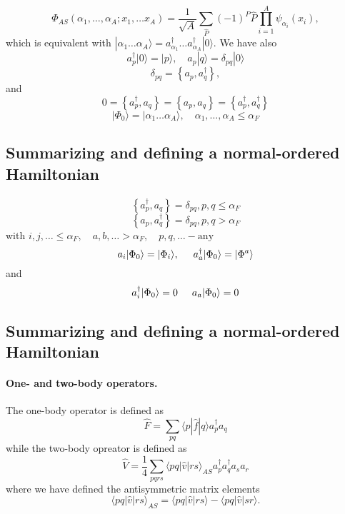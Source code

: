 \documentclass[%
twoside,                 %
final,                   %
10pt]{article}
\begin{document}
\paragraph{}
\[
  \Phi_{AS}(\alpha_1, \dots, \alpha_A; x_1, \dots x_A)=
            \frac{1}{\sqrt{A}} \sum_{\hat{P}} (-1)^P \hat{P} \prod_{i=1}^A \psi_{\alpha_i}(x_i),
\]
which is equivalent with $|\alpha_1 \dots \alpha_A\rangle= a_{\alpha_1}^{\dagger} \dots a_{\alpha_A}^{\dagger} |0\rangle$. We have also
    \[
        a_p^\dagger|0\rangle = |p\rangle, \quad a_p |q\rangle = \delta_{pq}|0\rangle
    \]
\[
  \delta_{pq} = \left\{a_p, a_q^\dagger \right\},
\]
and 
\[
0 = \left\{a_p^\dagger, a_q \right\} = \left\{a_p, a_q \right\} = \left\{a_p^\dagger, a_q^\dagger \right\}
\]
\[
|\Phi_0\rangle = |\alpha_1 \dots \alpha_A\rangle, \quad \alpha_1, \dots, \alpha_A \leq \alpha_F
\]




\subsection*{Summarizing and defining a normal-ordered Hamiltonian}

\paragraph{}
\[
\left\{a_p^\dagger, a_q \right\}= \delta_{pq}, p, q \leq \alpha_F 
\]
\[
\left\{a_p, a_q^\dagger \right\} = \delta_{pq}, p, q > \alpha_F
\]
with         $i,j,\ldots \leq \alpha_F, \quad a,b,\ldots > \alpha_F, \quad p,q, \ldots - \textrm{any}$
\[
        a_i|\Phi_0\rangle = |\Phi_i\rangle, \hspace{0.5cm} a_a^\dagger|\Phi_0\rangle = |\Phi^a\rangle
\]
and         
\[
a_i^\dagger|\Phi_0\rangle = 0 \hspace{0.5cm}  a_a|\Phi_0\rangle = 0
\]




\subsection*{Summarizing and defining a normal-ordered Hamiltonian}

\paragraph{One- and two-body operators.}
The one-body operator is defined as
\[
 \hat{F} = \sum_{pq} \langle p|\hat{f}|q\rangle a_p^\dagger a_q
\]
while the two-body opreator is defined as
\[
\hat{V} = \frac{1}{4} \sum_{pqrs} \langle pq|\hat{v}|rs\rangle_{AS} a_p^\dagger a_q^\dagger a_s a_r
\]
where we have defined the antisymmetric matrix elements
\[
\langle pq|\hat{v}|rs\rangle_{AS} = \langle pq|\hat{v}|rs\rangle - \langle pq|\hat{v}|sr\rangle.
\]
\end{document}
